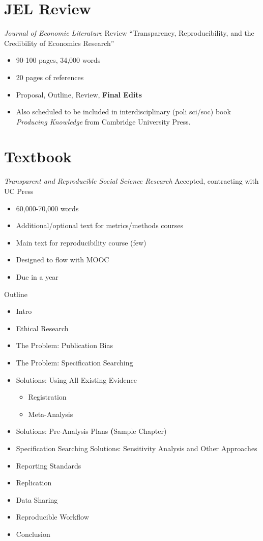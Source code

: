\documentclass{beamer}
\begin{document}
\section{JEL Review}
\begin{frame}{\textit{Journal of Economic Literature} Review}
``Transparency, Reproducibility, and the Credibility of Economics Research''
\begin{itemize}
\item 90-100 pages, 34,000 words
\item 20 pages of references
\item Proposal, Outline, Review, \textbf{Final Edits}
\item Also scheduled to be included in interdisciplinary (poli sci/soc) book \textit{Producing Knowledge} from Cambridge University Press.
\end{itemize}
\end{frame}
\section{Textbook}
\begin{frame}{\textit{Transparent and Reproducible Social Science Research}}
Accepted, contracting with UC Press
\begin{itemize}
\item 60,000-70,000 words
\item Additional/optional text for metrics/methods courses
\item Main text for reproducibility course (few) 
\item Designed to flow with MOOC \href{https://www.youtube.com/channel/UCQbo_mSWlTaKppIQViiVUZQ}{}
\item Due in a year
\end{itemize}
\end{frame}

\begin{frame}{Outline}
\begin{itemize}
\item Intro
\item Ethical Research
\item The Problem: Publication Bias
\item The Problem: Specification Searching
\item Solutions: Using All Existing Evidence
	\begin{itemize}
	\item Registration
	\item Meta-Analysis
	\end{itemize}
\item Solutions: Pre-Analysis Plans \textbf(Sample Chapter)
\item Specification Searching Solutions: Sensitivity Analysis and Other Approaches
\item Reporting Standards
\item Replication
\item Data Sharing
\item Reproducible Workflow
\item Conclusion
\end{itemize}
\end{frame}
\end{document}
